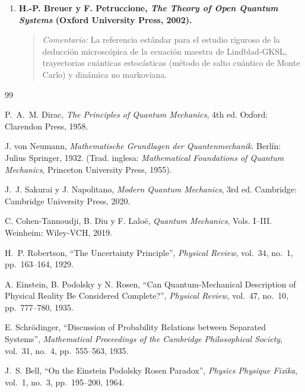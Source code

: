 \documentclass[11pt,a4paper,twoside]{report}
\theoremstyle{definition}
\theoremstyle{plain}
\theoremstyle{remark}
\begin{document}
\begin{enumerate}
    \item \textbf{H.-P. Breuer y F. Petruccione, \textit{The Theory of Open Quantum Systems} (Oxford University Press, 2002).}
    \begin{quote}
        \textit{Comentario:} La referencia estándar para el estudio riguroso de la deducción microscópica de la ecuación maestra de Lindblad-GKSL, trayectorias cuánticas estocásticas (método de salto cuántico de Monte Carlo) y dinámica no markoviana.
    \end{quote}
\end{enumerate}

\begin{thebibliography}{99}

P.~A.~M. Dirac, \textit{The Principles of Quantum Mechanics}, 4th ed. Oxford: Clarendon Press, 1958.

J. von Neumann, \textit{Mathematische Grundlagen der Quantenmechanik}. Berlín: Julius Springer, 1932. (Trad. inglesa: \textit{Mathematical Foundations of Quantum Mechanics}, Princeton University Press, 1955).

J.~J. Sakurai y J. Napolitano, \textit{Modern Quantum Mechanics}, 3rd ed. Cambridge: Cambridge University Press, 2020.

C. Cohen-Tannoudji, B. Diu y F. Laloë, \textit{Quantum Mechanics}, Vols. I--III. Weinheim: Wiley-VCH, 2019.

H.~P. Robertson, ``The Uncertainty Principle'', \textit{Physical Review}, vol.~34, no.~1, pp.~163--164, 1929.

A. Einstein, B. Podolsky y N. Rosen, ``Can Quantum-Mechanical Description of Physical Reality Be Considered Complete?'', \textit{Physical Review}, vol.~47, no.~10, pp.~777--780, 1935.

E. Schrödinger, ``Discussion of Probability Relations between Separated Systems'', \textit{Mathematical Proceedings of the Cambridge Philosophical Society}, vol.~31, no.~4, pp.~555--563, 1935.

J.~S. Bell, ``On the Einstein Podolsky Rosen Paradox'', \textit{Physics Physique Fizika}, vol.~1, no.~3, pp.~195--200, 1964.


\end{thebibliography}
\end{document}
